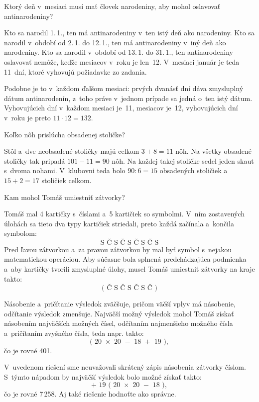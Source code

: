 {%
\napad
Ktorý deň v~mesiaci musí mať človek narodeniny, aby mohol oslavovať antinarodeniny?

\riesenie
Kto sa narodil 1.\,1., ten má antinarodeniny v~ten istý deň ako narodeniny.
Kto sa narodil v~období od 2.\,1. do 12.\,1., ten má antinarodeniny v~iný deň ako narodeniny.
Kto sa narodil v~období od 13.\,1. do 31.\,1., ten antinarodeniny oslavovať nemôže, keďže mesiacov v~roku je len~12.
V~mesiaci január je teda 11~dní, ktoré vyhovujú požiadavke zo zadania.

Podobne je to v~každom ďalšom mesiaci: prvých dvanásť dní dáva zmysluplný dátum antinarodenín, z~toho práve v~jednom prípade sa jedná o~ten istý dátum. Vyhovujúcich dní v~každom mesiaci je~11, mesiacov je~12, vyhovujúcich dní v~roku je preto $11\cdot12=132$.
}

{%
\napad
Koľko nôh prislúcha obsadenej stoličke?

\riesenie
Stôl a~dve neobsadené stoličky majú celkom $3+8=11$ nôh.
Na všetky obsadené stoličky tak pripadá $101-11=90$ nôh.
Na každej takej stoličke sedel jeden skaut s~dvoma nohami.
V~klubovni teda bolo $90:6=15$ obsadených stoličiek a~$15+2=17$ stoličiek celkom.

}

{%
\napad
Kam mohol Tomáš umiestniť zátvorky?

\riesenie
Tomáš mal 4 kartičky s~číslami a~5 kartičiek so symbolmi.
V~ním zostavených úlohách sa tieto dva typy kartičiek striedali, preto každá začínala a~končila symbolom:
$$\text{S\ Č\ S\ Č\ S\ Č\ S\ Č\ S}$$
Pred ľavou zátvorkou a~za pravou zátvorkou by mal byť symbol s~nejakou matematickou operáciou.
Aby súčasne bola splnená predchádzajúca podmienka a~aby kartičky tvorili zmysluplné úlohy, musel Tomáš umiestniť zátvorky na kraje takto:
$$\text{(\ Č\ S\ Č\ S\ Č\ S\ Č\ )}$$

Násobenie a~pričítanie výsledok zväčšuje, pričom väčší vplyv má násobenie, odčítanie výsledok zmenšuje.
Najväčší možný výsledok mohol Tomáš získať násobením najväčších možných čísel, odčítaním najmenšieho možného čísla a~pričítaním zvyšného čísla, teda napr. takto:
$$\text{(\ 20\ $\times$\ 20\ $-$\ 18\ $+$\ 19\ )},$$
čo je rovné 401.

\poznamka
V~uvedenom riešení sme neuvažovali skrátený zápis násobenia zátvorky číslom.
S~týmto nápadom by najväčší výsledok bolo možné získať takto:
$$\text{$+$\ 19\ (\ 20\ $\times$\ 20\ $-$\ 18\ )},$$
čo je rovné 7\,258.
Aj také riešenie hodnoťte ako správne.
}

